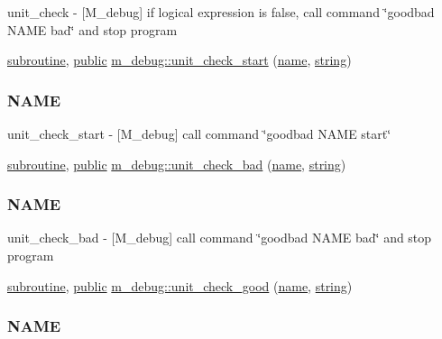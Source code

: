 \begin{DoxyCompactItemize}
\begin{DoxyCompactList}
unit\+\_\+check -\/ \mbox{[}M\+\_\+debug\mbox{]} if logical expression is false, call command \char`\"{}goodbad N\+A\+M\+E bad\char`\"{} and stop program \end{DoxyCompactList}\item 
\hyperlink{M__stopwatch_83_8txt_acfbcff50169d691ff02d4a123ed70482}{subroutine}, \hyperlink{M__stopwatch_83_8txt_a2f74811300c361e53b430611a7d1769f}{public} \hyperlink{namespacem__debug_a6f1166b1f25f39931359c1aa1b2219e5}{m\+\_\+debug\+::unit\+\_\+check\+\_\+start} (\hyperlink{M__stopwatch_83_8txt_a3f508a893ae4c3b397b4383e33b9bcae}{name}, \hyperlink{what__overview_81_8txt_a74cb7e955273b9f9157b4f0c18a38849}{string})
\begin{DoxyCompactList}\small\item\em \subsubsection*{N\+A\+ME}

unit\+\_\+check\+\_\+start -\/ \mbox{[}M\+\_\+debug\mbox{]} call command \char`\"{}goodbad N\+A\+M\+E start\char`\"{} \end{DoxyCompactList}\item 
\hyperlink{M__stopwatch_83_8txt_acfbcff50169d691ff02d4a123ed70482}{subroutine}, \hyperlink{M__stopwatch_83_8txt_a2f74811300c361e53b430611a7d1769f}{public} \hyperlink{namespacem__debug_a668813eec59e4c16d3bbc2d317e8cdee}{m\+\_\+debug\+::unit\+\_\+check\+\_\+bad} (\hyperlink{M__stopwatch_83_8txt_a3f508a893ae4c3b397b4383e33b9bcae}{name}, \hyperlink{what__overview_81_8txt_a74cb7e955273b9f9157b4f0c18a38849}{string})
\begin{DoxyCompactList}\small\item\em \subsubsection*{N\+A\+ME}

unit\+\_\+check\+\_\+bad -\/ \mbox{[}M\+\_\+debug\mbox{]} call command \char`\"{}goodbad N\+A\+M\+E bad\char`\"{} and stop program \end{DoxyCompactList}\item 
\hyperlink{M__stopwatch_83_8txt_acfbcff50169d691ff02d4a123ed70482}{subroutine}, \hyperlink{M__stopwatch_83_8txt_a2f74811300c361e53b430611a7d1769f}{public} \hyperlink{namespacem__debug_acd67428a8900ec4c36bd3a7b28d56987}{m\+\_\+debug\+::unit\+\_\+check\+\_\+good} (\hyperlink{M__stopwatch_83_8txt_a3f508a893ae4c3b397b4383e33b9bcae}{name}, \hyperlink{what__overview_81_8txt_a74cb7e955273b9f9157b4f0c18a38849}{string})
\begin{DoxyCompactList}\small\item\em \subsubsection*{N\+A\+ME}


\end{DoxyCompactList}
\end{DoxyCompactItemize}
